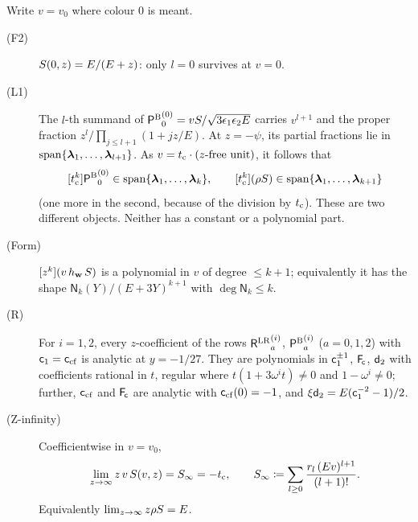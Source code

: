 \begin{cor}
\label{cor:row-closed}
Write $v=v_0$ where colour $0$ is meant.
\begin{description}
\item[(F2)] $S(0,z)=E/(E+z)$: only $l=0$ survives at $v=0$.
\item[(L1)] The $l$-th summand of ${\mathsf{P}^{\mathrm{B}}}_0^{(0)}=vS/\sqrt{3\epsilon_1\epsilon_2E}$ carries $v^{l+1}$ and the proper fraction $z^l/\prod_{j\leq l+1}(1+jz/E)$. At $z=-\psi$, its partial fractions lie in $\mathrm{span}\{\boldsymbol{\lambda}_1,\ldots,\boldsymbol{\lambda}_{l+1}\}$. As $v=t_{\mathrm{c}}\cdot(\text{$z$-free unit})$, it follows that
\[
[t_{\mathrm{c}}^k]{\mathsf{P}^{\mathrm{B}}}_0^{(0)}\in\mathrm{span}\{\boldsymbol{\lambda}_1,\ldots,\boldsymbol{\lambda}_k\},\qquad[t_{\mathrm{c}}^k](\rho S)\in\mathrm{span}\{\boldsymbol{\lambda}_1,\ldots,\boldsymbol{\lambda}_{k+1}\}
\]
(one more in the second, because of the division by $t_{\mathrm{c}}$). These are two different objects. Neither has a constant or a polynomial part.
\item[(Form)] $[z^k](v\,h_{\mathbf{w}}\,S)$ is a polynomial in $v$ of degree $\leq k+1$; equivalently it has the shape $\mathsf{N}_k(Y)/(E+3Y)^{k+1}$ with $\deg\mathsf{N}_k\leq k$.
\item[(R)] For $i=1,2$, every $z$-coefficient of the rows ${\mathsf{R}^{\mathrm{LR}}}_a^{(i)}$, ${\mathsf{P}^{\mathrm{B}}}_a^{(i)}$ ($a=0,1,2$) with $\mathsf{c}_{1}=\mathsf{c}_{\mathrm{cf}}$ is analytic at $y=-1/27$. They are polynomials in $\mathsf{c}_{1}^{\pm1}$, $\mathsf{F}_{\!\mathsf{c}}$, $\mathsf{d}_{2}$ with coefficients rational in $t$, regular where $t(1+3\omega^it)\neq0$ and $1-\omega^i\neq0$; further, $\mathsf{c}_{\mathrm{cf}}$ and $\mathsf{F}_{\!\mathsf{c}}$ are analytic with $\mathsf{c}_{\mathrm{cf}}(0)=-1$, and $\xi\mathsf{d}_{2}=E(\mathsf{c}_{1}^{-2}-1)/2$.
\item[(Z-infinity)] Coefficientwise in $v=v_0$,
\begin{equation}
\label{eq:row-zinf}
\lim_{z\to\infty}z\,v\,S(v,z)=S_{\infty}=-t_{\mathrm{c}},\qquad S_{\infty}\coloneqq\sum_{l\geq0}\frac{r_l\,(Ev)^{l+1}}{(l+1)!}.
\end{equation}
Equivalently $\lim_{z\to\infty}z\rho S=E$.
\end{description}
\end{cor}

